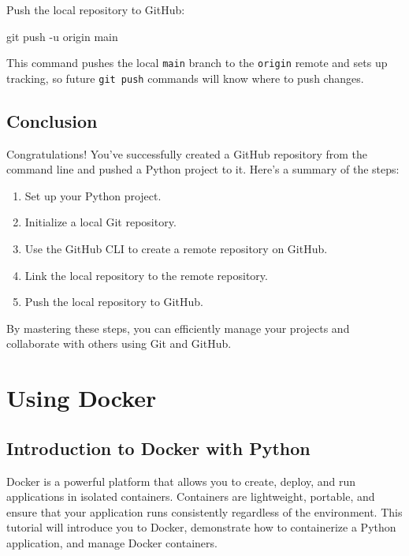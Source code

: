 \documentclass[
  letterpaper,
  DIV=11,
  numbers=noendperiod]{scrreprt}
\newenvironment{Shaded}{\begin{snugshade}}{\end{snugshade}}
\newcommand{\AttributeTok}[1]{\textcolor[rgb]{0.40,0.45,0.13}{#1}}
\newcommand{\FunctionTok}[1]{\textcolor[rgb]{0.28,0.35,0.67}{#1}}
\newcommand{\NormalTok}[1]{\textcolor[rgb]{0.00,0.23,0.31}{#1}}
\providecommand{\tightlist}{%
  \setlength{\itemsep}{0pt}\setlength{\parskip}{0pt}}\usepackage{longtable,booktabs,array}
\begin{document}
Push the local repository to GitHub:

\begin{Shaded}
\begin{Highlighting}[]
\FunctionTok{git}\NormalTok{ push }\AttributeTok{{-}u}\NormalTok{ origin main}
\end{Highlighting}
\end{Shaded}

This command pushes the local \texttt{main} branch to the
\texttt{origin} remote and sets up tracking, so future
\texttt{git\ push} commands will know where to push changes.

\section{Conclusion}\label{conclusion-47}

Congratulations! You've successfully created a GitHub repository from
the command line and pushed a Python project to it. Here's a summary of
the steps:

\begin{enumerate}
\def\labelenumi{\arabic{enumi}.}
\tightlist
\item
  Set up your Python project.
\item
  Initialize a local Git repository.
\item
  Use the GitHub CLI to create a remote repository on GitHub.
\item
  Link the local repository to the remote repository.
\item
  Push the local repository to GitHub.
\end{enumerate}

By mastering these steps, you can efficiently manage your projects and
collaborate with others using Git and GitHub.


\chapter{Using Docker}\label{using-docker}

\section{Introduction to Docker with
Python}\label{introduction-to-docker-with-python}

Docker is a powerful platform that allows you to create, deploy, and run
applications in isolated containers. Containers are lightweight,
portable, and ensure that your application runs consistently regardless
of the environment. This tutorial will introduce you to Docker,
demonstrate how to containerize a Python application, and manage Docker
containers.
\end{document}
